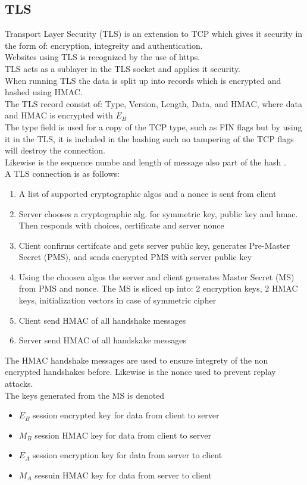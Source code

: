 \documentclass[12pt, a4paper]{article}
\begin{document}
		\subsection{TLS}
			Transport Layer Security (TLS) is an extension to TCP which gives it security in the form of: encryption, integreity and authentication.\\
			Websites using TLS is recognized by the use of https.\\
			TLS acts as a sublayer in the TLS socket and applies it security.\\
			When running TLS the data is split up into records which is encrypted and hashed using HMAC.\\
			The TLS record consist of: Type, Version, Length, Data, and HMAC, where data and HMAC is encrypted with $E_B$\\
			The type field is used for a copy of the TCP type, such as FIN flags but by using it in the TLS, it is included in the hashing such no tampering of the TCP flags will destroy the connection.\\
			Likewise is the sequence numbe and length of message also part of the hash .\\
			A TLS connection is as follows:
			\begin{enumerate}
				\item A list of supported cryptographic algos and a nonce is sent from client
				\item Server chooses a cryptographic alg. for symmetric key, public key and hmac. Then responds with choices, certificate and server nonce
				\item Client confirms certifcate and gets server public key, generates Pre-Master Secret (PMS), and sends encrypted PMS with server public key
				\item Using the choosen algos the server and client generates Master Secret (MS) from PMS and nonce. The MS is sliced up into: 2 encryption keys, 2 HMAC keys, initialization vectors in case of symmetric cipher
				\item Client send HMAC of all handshake messages
				\item Server send HMAC of all handskake messages
			\end{enumerate}
			The HMAC handshake messages are used to ensure integrety of the non encrypted handshakes before. Likewise is the nonce used to prevent replay attacks. \\
			The keys generated from the MS is denoted
			\begin{itemize}
				\item $E_B$ session encrypted key for data from client to server
				\item $M_B$ session HMAC key for data from client to server
				\item $E_A$ session encryption key for data from server to client
				\item $M_A$ sessuin HMAC key for data from server to client
			\end{itemize}
\end{document}
